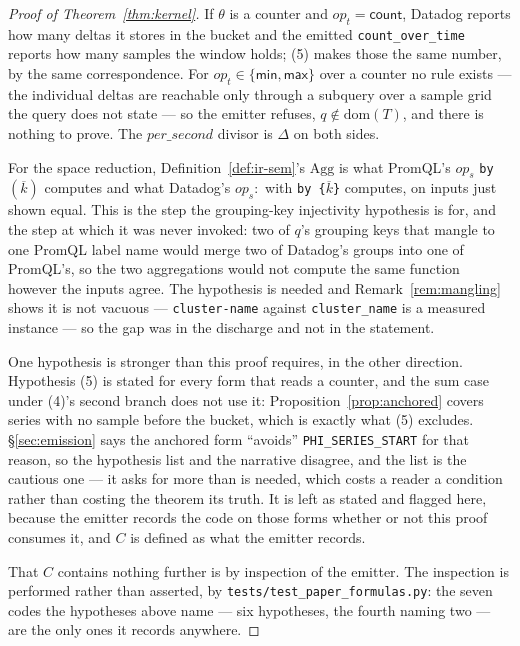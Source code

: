 \begin{proof}[Proof of Theorem~\ref{thm:kernel}]
If $\theta$ is a counter and $\mathit{op}_t=\mathsf{count}$, Datadog reports how many
deltas it stores in the bucket and the emitted \texttt{count\_over\_time} reports how
many samples the window holds; (5) makes those the same number, by the same
correspondence. For $\mathit{op}_t\in\{\mathsf{min},\mathsf{max}\}$ over a counter no
rule exists --- the individual deltas are reachable only through a subquery over a
sample grid the query does not state --- so the emitter refuses,
$q\notin\mathrm{dom}(T)$, and there is nothing to prove.
The $\mathit{per\_second}$ divisor is $\Delta$ on both sides.

For the space reduction, Definition~\ref{def:ir-sem}'s $\mathrm{Agg}$ is what PromQL's
$\mathit{op}_s$ \texttt{by} $(\overline{k})$ computes and what Datadog's
$\mathit{op}_s{:}$ with \texttt{by \{$\overline{k}$\}} computes, on inputs just shown
equal. This is the step the grouping-key injectivity hypothesis is for, and the step at
which it was never invoked: two of $q$'s grouping keys that mangle to one PromQL label
name would merge two of Datadog's groups into one of PromQL's, so the two aggregations
would not compute the same function however the inputs agree. The hypothesis is needed
and Remark~\ref{rem:mangling} shows it is not vacuous --- \texttt{cluster-name} against
\texttt{cluster\_name} is a measured instance --- so the gap was in the discharge and not
in the statement.

One hypothesis is stronger than this proof requires, in the other direction. Hypothesis
(5) is stated for every form that reads a counter, and the sum case under (4)'s second
branch does not use it: Proposition~\ref{prop:anchored} covers series with no sample
before the bucket, which is exactly what (5) excludes. \S\ref{sec:emission} says the
anchored form ``avoids'' \texttt{PHI\_SERIES\_START} for that reason, so the hypothesis
list and the narrative disagree, and the list is the cautious one --- it asks for more
than is needed, which costs a reader a condition rather than costing the theorem its
truth. It is left as stated and flagged here, because the emitter records the code on
those forms whether or not this proof consumes it, and $C$ is defined as what the
emitter records.

That $C$ contains nothing further is by inspection of the emitter. The inspection is
performed rather than asserted, by
\texttt{tests\slash test\_paper\_formulas.py}: the seven
codes the hypotheses above name --- six hypotheses, the fourth naming two --- are the
only ones it records anywhere.
\end{proof}

